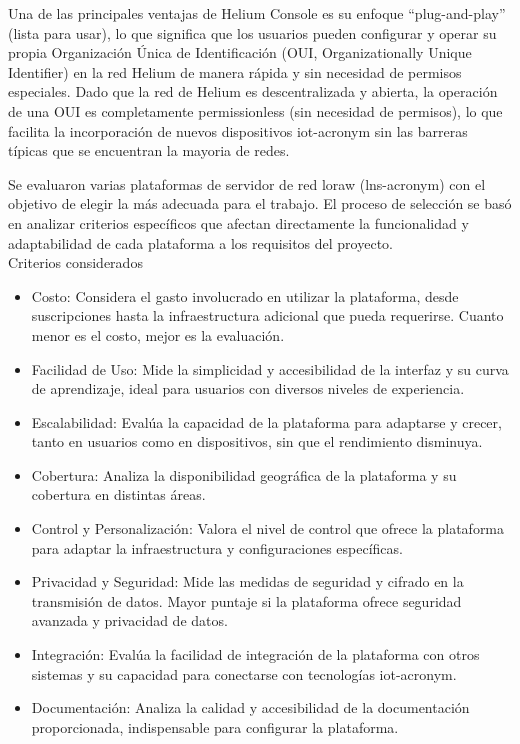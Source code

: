Una de las principales ventajas de Helium Console es su enfoque “plug-and-play” (lista para usar), lo que significa que los usuarios pueden configurar y operar su propia Organización Única de Identificación (OUI, Organizationally Unique Identifier) en la red Helium de manera rápida y sin necesidad de permisos especiales. Dado que la red de Helium es descentralizada y abierta, la operación de una OUI es completamente permissionless (sin necesidad de permisos), lo que facilita la incorporación de nuevos dispositivos \acrshort{iot-acronym} sin las barreras típicas que se encuentran la mayoria de redes.

Se evaluaron varias plataformas de servidor de red \acrshort{loraw} (\acrshort{lns-acronym}) con el objetivo de elegir la más adecuada para el trabajo. El proceso de selección se basó en analizar criterios específicos que afectan directamente la funcionalidad y adaptabilidad de cada plataforma a los requisitos del proyecto.
\\
Criterios considerados
\begin{itemize}

\item Costo: Considera el gasto involucrado en utilizar la plataforma, desde suscripciones hasta la infraestructura adicional que pueda requerirse. Cuanto menor es el costo, mejor es la evaluación.

\item Facilidad de Uso: Mide la simplicidad y accesibilidad de la interfaz y su curva de aprendizaje, ideal para usuarios con diversos niveles de experiencia.

\item Escalabilidad: Evalúa la capacidad de la plataforma para adaptarse y crecer, tanto en usuarios como en dispositivos, sin que el rendimiento disminuya.

\item Cobertura: Analiza la disponibilidad geográfica de la plataforma y su cobertura en distintas áreas.

\item Control y Personalización: Valora el nivel de control que ofrece la plataforma para adaptar la infraestructura y configuraciones específicas.

\item Privacidad y Seguridad: Mide las medidas de seguridad y cifrado en la transmisión de datos. Mayor puntaje si la plataforma ofrece seguridad avanzada y privacidad de datos.

\item Integración: Evalúa la facilidad de integración de la plataforma con otros sistemas y su capacidad para conectarse con tecnologías \acrshort{iot-acronym}.

\item Documentación: Analiza la calidad y accesibilidad de la documentación proporcionada, indispensable para configurar la plataforma.
 
\end{itemize}

